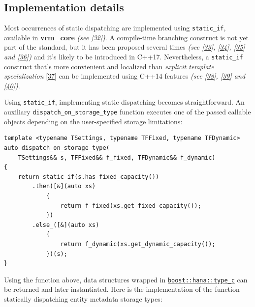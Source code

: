 \documentclass[twoside, 12pt, a4paper, openright]{book}
\begin{document}
\subsection{Implementation details}\label{implementation-details-5}

Most occurrences of static dispatching are implemented using
\texttt{static_if},
available in \textbf{vrm\_core} \emph{(see
{[}\protect\hyperlink{ref-github_vrmcore}{32}{]})}. A compile-time
branching construct is not yet part of the standard, but it has been
proposed several times \emph{(see
{[}\protect\hyperlink{ref-isocpp_sif0}{33}{]},
{[}\protect\hyperlink{ref-isocpp_sif1}{34}{]},
{[}\protect\hyperlink{ref-isocpp_sif2}{35}{]} and
{[}\protect\hyperlink{ref-isocpp_sif3}{36}{]})} and it's likely to be
introduced in C++17. Nevertheless, a
\texttt{static_if}
construct that's more convienient and localized than \emph{explicit
template specialization}
{[}\protect\hyperlink{ref-cppreference_ets}{37}{]} can be implemented
using C++14 features \emph{(see {[}\protect\hyperlink{ref-sif0}{38}{]},
{[}\protect\hyperlink{ref-sif1}{39}{]} and
{[}\protect\hyperlink{ref-sif2}{40}{]})}.

Using
\texttt{static_if},
implementing static dispatching becomes straightforward. An auxiliary
\texttt{dispatch_on_storage_type}
function executes one of the passed callable objects depending on the
user-specified storage limitations:

\begin{verbatim}
template <typename TSettings, typename TFFixed, typename TFDynamic>
auto dispatch_on_storage_type(
    TSettings&& s, TFFixed&& f_fixed, TFDynamic&& f_dynamic)
{
    return static_if(s.has_fixed_capacity())
        .then([&](auto xs)
            {
                return f_fixed(xs.get_fixed_capacity());
            })
        .else_([&](auto xs)
            {
                return f_dynamic(xs.get_dynamic_capacity());
            })(s);
}
\end{verbatim}

Using the function above, data structures wrapped in
\href{http://www.boost.org/doc/libs/1_61_0/libs/hana/doc/html/structboost_1_1hana_1_1type.html\#ae35139e732c4b75e91061513cf445628}{\texttt{boost::hana::type_c}}
can be returned and later instantiated. Here is the implementation of
the function statically dispatching entity metadata storage types:
\end{document}

